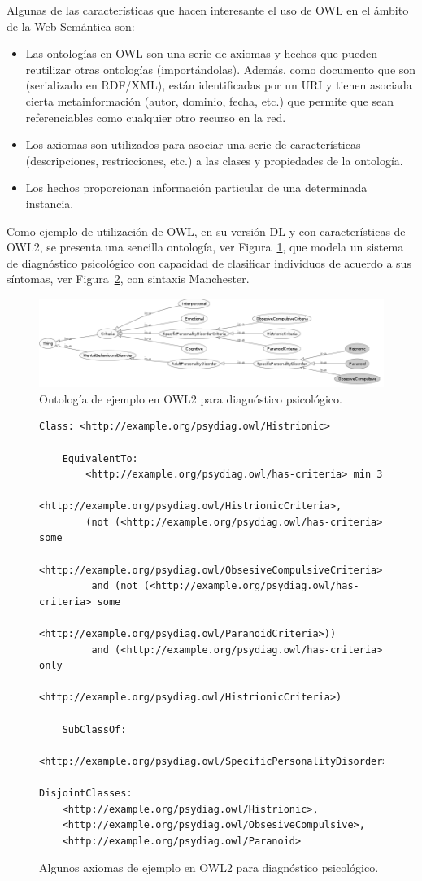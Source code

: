Algunas de las características que hacen interesante el uso de OWL en el ámbito
de la Web Semántica son:
\begin{itemize}
  \item Las ontologías en OWL son una serie de axiomas y hechos que pueden
  reutilizar otras ontologías (importándolas). Además, como documento que son
  (serializado en RDF/XML), están identificadas por un URI y tienen asociada cierta metainformación
  (autor, dominio, fecha, etc.) que permite que sean referenciables como
  cualquier otro recurso en la red.
  \item Los axiomas son utilizados para asociar una serie de características
  (descripciones, restricciones, etc.) a las clases y propiedades de la
  ontología. 
\item Los hechos proporcionan información particular de una determinada instancia. 
\end{itemize}

Como ejemplo de utilización de OWL, en su versión DL y con características de OWL2, se presenta una sencilla
ontología, ver Figura~\ref{fig:psydiag}, que modela un sistema de diagnóstico psicológico con capacidad de clasificar individuos
de acuerdo a sus síntomas, ver Figura~\ref{fig:psydiag-axiomas}, con sintaxis Manchester.

\begin{figure}[htb]
\centering
	\includegraphics[width=16cm]{images/psydiag}
\caption{Ontología de ejemplo en OWL2 para diagnóstico psicológico.}
\label{fig:psydiag}
\end{figure}


\begin{figure}[htb]
\centering
 \begin{lstlisting} 
Class: <http://example.org/psydiag.owl/Histrionic>

    EquivalentTo: 
        <http://example.org/psydiag.owl/has-criteria> min 3
	      <http://example.org/psydiag.owl/HistrionicCriteria>,
        (not (<http://example.org/psydiag.owl/has-criteria> some 
	      <http://example.org/psydiag.owl/ObsesiveCompulsiveCriteria>))
         and (not (<http://example.org/psydiag.owl/has-criteria> some 
	      <http://example.org/psydiag.owl/ParanoidCriteria>))
         and (<http://example.org/psydiag.owl/has-criteria> only 
	      <http://example.org/psydiag.owl/HistrionicCriteria>)
    
    SubClassOf: 
        <http://example.org/psydiag.owl/SpecificPersonalityDisorder>

DisjointClasses: 
    <http://example.org/psydiag.owl/Histrionic>,
    <http://example.org/psydiag.owl/ObsesiveCompulsive>,
    <http://example.org/psydiag.owl/Paranoid>
  \end{lstlisting} 
\caption{Algunos axiomas de ejemplo en OWL2 para diagnóstico psicológico.}
\label{fig:psydiag-axiomas}
\end{figure}


